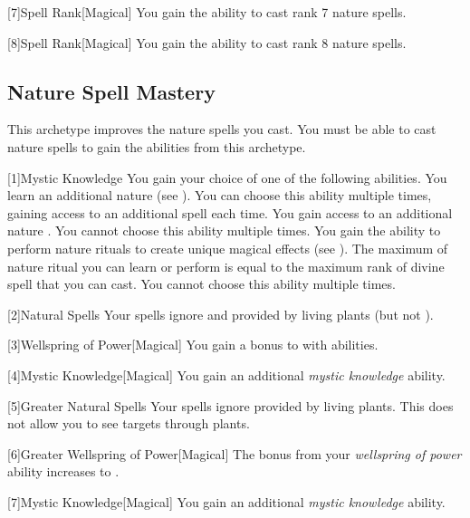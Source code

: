         [7]{Spell Rank}[Magical] You gain the ability to cast rank 7 nature spells.

        [8]{Spell Rank}[Magical] You gain the ability to cast rank 8 nature spells.

    \subsection{Nature Spell Mastery}
        This archetype improves the nature spells you cast.
        You must be able to cast nature spells to gain the abilities from this archetype.

        [1]{Mystic Knowledge}
        You gain your choice of one of the following abilities.
        {
             You learn an additional nature  (see ).
                You can choose this ability multiple times, gaining access to an additional spell each time.
             You gain access to an additional nature .
                You cannot choose this ability multiple times.
             You gain the ability to perform nature rituals to create unique magical effects (see ).
                The maximum  of nature ritual you can learn or perform is equal to the maximum rank of divine spell that you can cast.
                You cannot choose this ability multiple times.
        }

        [2]{Natural Spells} Your spells ignore  and  provided by living plants (but not ).

        [3]{Wellspring of Power}[Magical]
        You gain a  bonus to  with  abilities.

        [4]{Mystic Knowledge}[Magical]
        You gain an additional \textit{mystic knowledge} ability.

        [5]{Greater Natural Spells} Your spells ignore  provided by living plants.
        This does not allow you to see targets through plants.

        [6]{Greater Wellspring of Power}[Magical]
        The bonus from your \textit{wellspring of power} ability increases to .

        [7]{Mystic Knowledge}[Magical]
        You gain an additional \textit{mystic knowledge} ability.

